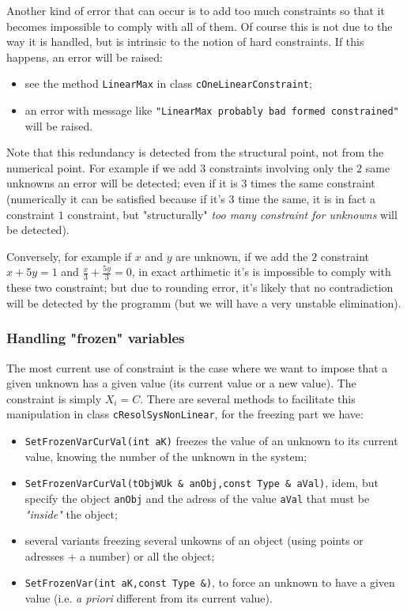 Another kind of error that can occur is to add too much constraints so that it becomes
impossible to comply with all of them. Of course this is not due to the way it is handled,
but is intrinsic to the notion of hard constraints. If this happens, an error
will be raised:

\begin{itemize}
     \item  see the method {\tt LinearMax} in class  {\tt cOneLinearConstraint};
     \item  an error with  message like {\tt "LinearMax probably bad formed constrained"} will be raised.
\end{itemize}

Note that this redundancy is detected from the structural point, not from the numerical point. For example
if we add $3$ constraints involving only the $2$ same unknowns an error will be detected; even if it is
$3$ times the same constraint (numerically it can be satisfied because if it's $3$ time the same, it is in
fact a constraint $1$ constraint, but "structurally" \emph{too many constraint for unknowns} will be detected).


Conversely, for example if $x$ and $y$ are unknown, if we add the $2$ constraint $x+5y=1$ and $\frac{x}{3}+ \frac{5y}{3}=0$,
in exact arthimetic it's is impossible to comply with these two constraint; but due to rounding error, it's likely
that no contradiction will be detected by the programm (but we will have a very unstable elimination).


\subsubsection{Handling "frozen" variables}

The most current use of constraint is the case where we want to impose that a given unknown
has a given value (its current value or a new value). The constraint is simply
$X_i=C$.   There are several methods to facilitate this manipulation in class {\tt cResolSysNonLinear}, for
the freezing part we have:

\begin{itemize}
     \item   {\tt SetFrozenVarCurVal(int aK)} freezes the value of an unknown to its current value,
              knowing the number of the unknown in the system;
     \item   {\tt SetFrozenVarCurVal(tObjWUk \& anObj,const  Type \& aVal)}, idem, but specify the object {\tt anObj}
	     and the adress of the value {\tt aVal} that must be \emph{"inside"} the object;
     \item  several variants freezing several unkowns of an object (using points or adresses + a number) or all the
            object;
      \item  {\tt SetFrozenVar(int aK,const  Type \&)}, to force an unknown to have a given value
             (i.e. \emph{a priori} different from its current value).

\end{itemize}

